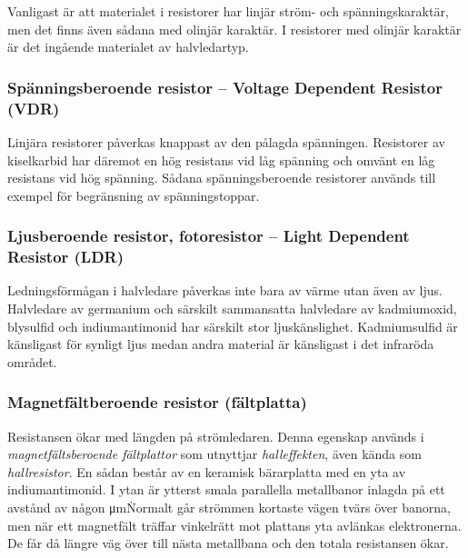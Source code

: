 Vanligast är att materialet i resistorer har linjär ström- och spänningskaraktär,
men det finns även sådana med olinjär karaktär. I resistorer med olinjär
karaktär är det ingående materialet av halvledartyp.

\subsubsection{Spänningsberoende resistor -- Voltage Dependent Resistor (VDR)}

Linjära resistorer påverkas knappast av den pålagda spänningen.
Resistorer av kiselkarbid har däremot en hög resistans vid låg spänning och
omvänt en låg resistans vid hög spänning.
Sådana spänningsberoende resistorer används till exempel för begränsning av
spänningstoppar.

\subsubsection{Ljusberoende resistor, fotoresistor -- Light Dependent Resistor (LDR)}

Ledningsförmågan i halvledare påverkas inte bara av värme utan även av ljus.
Halvledare av germanium och särskilt sammansatta halvledare av kadmiumoxid,
blysulfid och indiumantimonid har särskilt stor ljuskänslighet. Kadmiumsulfid
är känsligast för synligt ljus medan andra material är känsligast i det
infraröda området.

\subsubsection{Magnetfältberoende resistor (fältplatta)}

Resistansen ökar med längden på strömledaren. Denna egenskap används i
\emph{magnetfältsberoende fältplattor} som utnyttjar \emph{halleffekten}, även
kända som \emph{hallresistor}. En sådan består av en keramisk bärarplatta med
en yta av indiumantimonid.
I ytan är ytterst smala parallella metallbanor inlagda på ett avstånd av någon
\si{\micro\metre}\.
Normalt går strömmen kortaste vägen tvärs över banorna, men när ett magnetfält
träffar vinkelrätt mot plattans yta avlänkas elektronerna.
De får då längre väg över till nästa metallbana och den totala resistansen
ökar.

